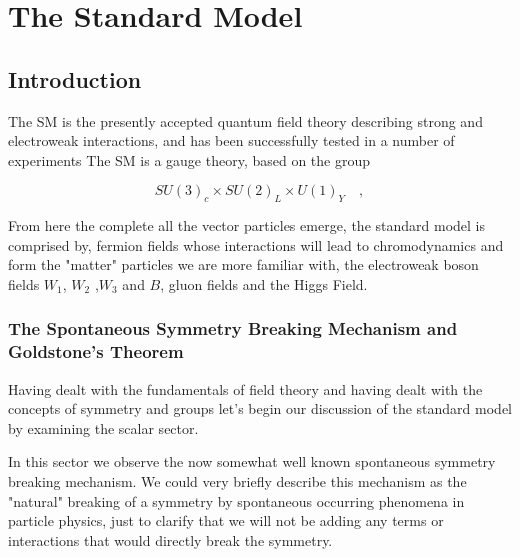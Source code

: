 \documentclass[11pt,twoside,a4paper]{article}
\begin{document}
\chapter{The Standard Model}
\section{Introduction}

The SM is the presently accepted quantum field theory describing strong and electroweak interactions, and has been successfully tested in a number of experiments The SM is a gauge theory, based on the group

\begin{equation}
SU(3)_c \times SU(2)_L \times U(1)_Y \quad  ,
\end{equation}

From here the complete all the vector particles emerge, the standard model is comprised by, fermion fields whose interactions will lead to chromodynamics and form the "matter" particles we are more familiar with, the electroweak boson fields $W_1$, $W_2$ ,$W_3$  and $B$, gluon fields and the Higgs Field. 


\begin{comment}
\begin{equation}
D_\mu = \partial_\mu - i g_S \tau^a G^a_\mu - i g T^i W^i_\mu - i g' Y B_\mu 
\end{equation}

Where $\tau^a$ where $\tau^a= \frac{\lambda_a}{2}$ , $(a = 1, . . . , 8)$ are the generators of $SU (3)_c$, $T_i= \frac{\sigma_i}{2} $, $(i = 1, 2, 3)$ are the generators of $SU(2)_L$ and Y is the generator of $U(1)_Y$. Here the symbols $\lambda_a$ and $\sigma_i$ represent the Gell-Mann and Pauli matrices respectively. We'll during this chapter show how this particular derivative arises from the physical constraints of our theory. 
\end{comment}


\subsection{The Spontaneous Symmetry Breaking Mechanism and Goldstone's Theorem} 
Having dealt with the fundamentals of field theory and having dealt with the concepts of symmetry and groups let's begin our discussion of the standard model by examining the scalar sector. 

In this sector we observe the now somewhat well known spontaneous symmetry breaking mechanism. We could very briefly describe this mechanism as the "natural" breaking of a symmetry by spontaneous occurring phenomena in particle physics, just to clarify that we will not be adding any terms or interactions that would directly break the symmetry. 
\end{document}
